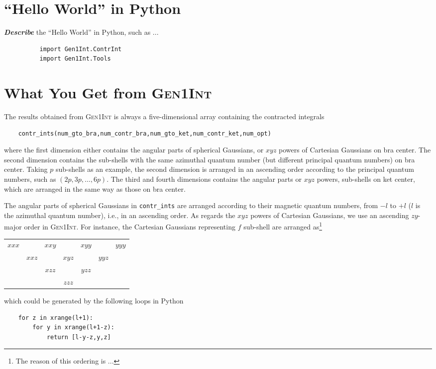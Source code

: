 \documentclass[a4paper,11pt,twoside,openright]{book}
\newcommand{\fixme}[1]{\textbf{\textit{\color{red} #1}}}
\begin{document}
\section{``Hello World'' in Python}
\label{sect:hello-world-py}

\fixme{Describe} the ``Hello World'' in Python, such as ...
\begin{verbatim}
          import Gen1Int.ContrInt
          import Gen1Int.Tools
\end{verbatim}

\section{What You Get from \textsc{Gen1Int}}
\label{sect:orders}

The results obtained from \textsc{Gen1Int} is always a five-dimensional array containing
the contracted integrals
\begin{verbatim}
    contr_ints(num_gto_bra,num_contr_bra,num_gto_ket,num_contr_ket,num_opt)
\end{verbatim}
where the first dimension either contains the angular parts of spherical Gaussians, or $xyz$
powers of Cartesian Gaussians on bra center. The second dimension contains the sub-shells
with the same azimuthal quantum number (but different principal quantum numbers) on bra
center. Taking $p$ sub-shells as an example, the second dimension is arranged in an ascending
order according to the principal quantum numbers, such as $(2p,3p,\dots,6p)$. The third
and fourth dimensions contains the angular parts or $xyz$ powers, sub-shells on ket center,
which are arranged in the same way as those on bra center.

The angular parts of spherical Gaussians in \verb|contr_ints| are arranged according to their
magnetic quantum numbers, from $-l$ to $+l$ ($l$ is the azimuthal quantum number), i.e., in
an ascending order. As regards the $xyz$ powers of Cartesian Gaussians, we use an ascending
$zy$-major order in \textsc{Gen1Int}. For instance, the Cartesian Gaussians representing
$f$ sub-shell are arranged as\footnote{The reason of this ordering is ...}
\begin{center}
  \begin{tabular}{ccccccc}
    $xxx$ & & $xxy$ & & $xyy$ & & $yyy$\\
    & $xxz$ & & $xyz$ & & $yyz$ &\\
    & & $xzz$ & & $yzz$ & &\\
    & & & $zzz$ & & &\\
  \end{tabular}
\end{center}
which could be generated by the following loops in Python
\begin{verbatim}
    for z in xrange(l+1):
        for y in xrange(l+1-z):
            return [l-y-z,y,z]
\end{verbatim}
\end{document}

